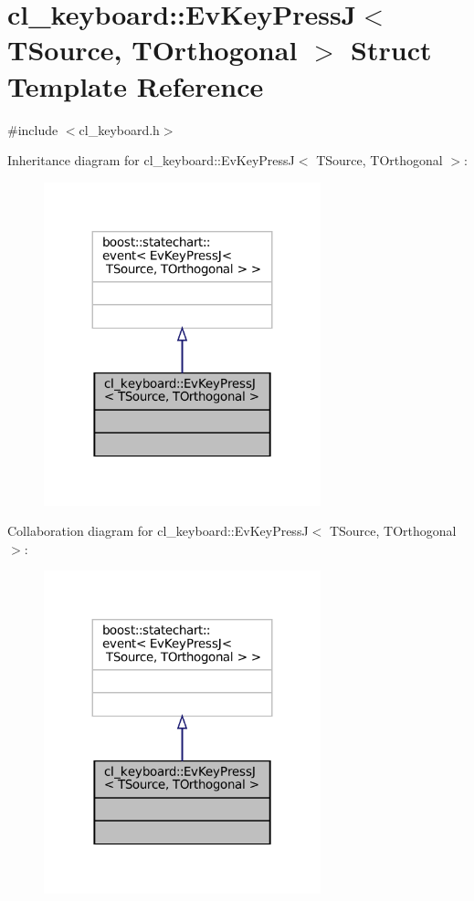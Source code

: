 \hypertarget{structcl__keyboard_1_1EvKeyPressJ}{}\section{cl\+\_\+keyboard\+:\+:Ev\+Key\+PressJ$<$ T\+Source, T\+Orthogonal $>$ Struct Template Reference}
\label{structcl__keyboard_1_1EvKeyPressJ}


{\ttfamily \#include $<$cl\+\_\+keyboard.\+h$>$}



Inheritance diagram for cl\+\_\+keyboard\+:\+:Ev\+Key\+PressJ$<$ T\+Source, T\+Orthogonal $>$\+:
\nopagebreak
\begin{figure}[H]
\begin{center}
\leavevmode
\includegraphics[width=227pt]{structcl__keyboard_1_1EvKeyPressJ__inherit__graph}
\end{center}
\end{figure}


Collaboration diagram for cl\+\_\+keyboard\+:\+:Ev\+Key\+PressJ$<$ T\+Source, T\+Orthogonal $>$\+:
\nopagebreak
\begin{figure}[H]
\begin{center}
\leavevmode
\includegraphics[width=227pt]{structcl__keyboard_1_1EvKeyPressJ__coll__graph}
\end{center}
\end{figure}


